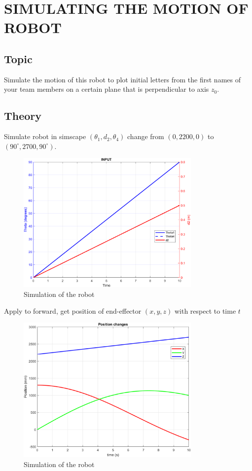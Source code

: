 \chapter{SIMULATING THE MOTION OF ROBOT}
    \section{Topic}
    Simulate the motion of this robot to plot initial letters from the first names of your team members on a certain plane that is perpendicular to axis \( z_0 \).
    \section{Theory}
        Simulate robot in simscape $(\theta_1, d_2, \theta_4)$ change from $(0,2200, 0)$ to $(90^{\circ}, 2700, 90^{\circ})$.
        \begin{figure}[H]
            \centering
            \includegraphics[width=0.8\textwidth]{pictures/theta_d_change.png}
            \caption{Simulation of the robot}
            \label{fig:theta_d_change}
        \end{figure}
        Apply to forward, get position of end-effector \( (x,y,z) \) with respect to time \( t \)
        \begin{figure}[H]
            \centering
            \includegraphics[width=0.8\textwidth]{pictures/test_forward.png}
            \caption{Simulation of the robot}
            \label{fig:test_forward}
        \end{figure}

